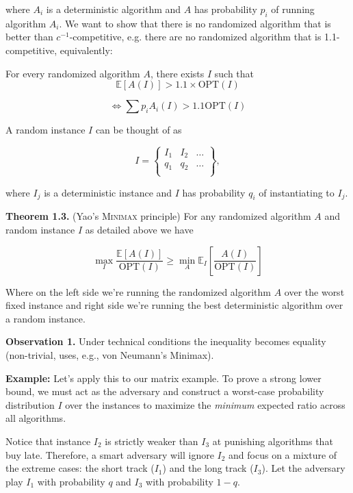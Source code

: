\documentclass[14pt]{extreport}
\begin{document}
where \( A_i \) is a deterministic algorithm and \( A \) has probability \( p_i \) of running algorithm \( A_i \). We want to show that there is no randomized algorithm that is better than \( c^{-1} \)-competitive, e.g. there are no randomized algorithm that is 1.1-competitive, equivalently:

\vspace{5mm}
For every randomized algorithm $A$,  there exists $I$ such that  $$\mathbb{E}[A(I)] > 1.1 \times \text{OPT}(I)$$

\[
\Leftrightarrow \sum p_i A_i(I) > 1.1 \text{OPT}(I)
\]

A random instance \( I \) can be thought of as

\[
I = \left\{ \begin{array}{ccc}
I_1 & I_2 & \ldots \\
q_1 & q_2 & \ldots \\
\end{array} \right\},
\]

where \( I_j \) is a deterministic instance and \( I \) has probability \( q_i \) of instantiating to \( I_j \).

\vspace{5mm}
\textbf{Theorem 1.3.} (Yao's \textsc{Minimax} principle) For any randomized algorithm $A$ and random instance $I$ as detailed above we have

$$
\max_{I} \frac{\mathbb{E}[A(I)]}{\text{OPT}(I)} \geq \min_{A} \mathbb{E}_I \left[ \frac{A(I)}{\text{OPT}(I)} \right]
$$

Where on the left side we're running the randomized algorithm $A$ over the worst fixed instance and right side we're running the best deterministic algorithm over a random instance.

\vspace{5mm}
\textbf{Observation 1.} Under technical conditions the inequality becomes equality (non-trivial, uses, e.g., von Neumann's Minimax).

\vspace{5mm}
\textbf{Example:} Let's apply this to our matrix example. To prove a strong lower bound, we must act as the adversary and construct a worst-case probability distribution $I$ over the instances to maximize the \textit{minimum} expected ratio across all algorithms.

\vspace{5mm}
Notice that instance $I_2$ is strictly weaker than $I_3$ at punishing algorithms that buy late. Therefore, a smart adversary will ignore $I_2$ and focus on a mixture of the extreme cases: the short track ($I_1$) and the long track ($I_3$). Let the adversary play $I_1$ with probability $q$ and $I_3$ with probability $1-q$.
\end{document}
